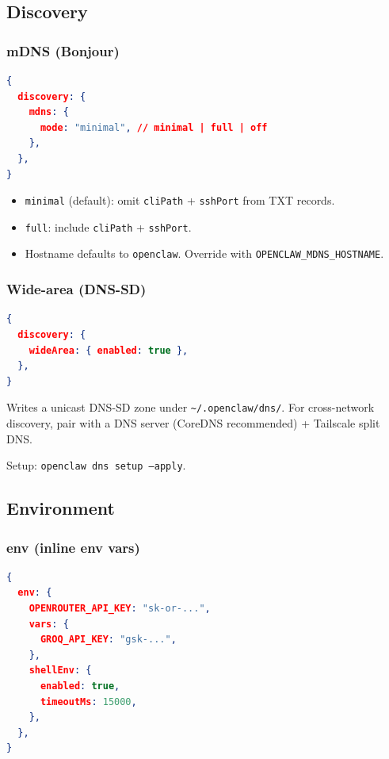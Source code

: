 \hrulefill


\subsection{Discovery}


\subsubsection{mDNS (Bonjour)}


\begin{lstlisting}[language=json]
{
  discovery: {
    mdns: {
      mode: "minimal", // minimal | full | off
    },
  },
}
\end{lstlisting}


\begin{itemize}
  \item \texttt{minimal} (default): omit \texttt{cliPath} + \texttt{sshPort} from TXT records.
  \item \texttt{full}: include \texttt{cliPath} + \texttt{sshPort}.
  \item Hostname defaults to \texttt{openclaw}. Override with \texttt{OPENCLAW\_MDNS\_HOSTNAME}.
\end{itemize}


\subsubsection{Wide-area (DNS-SD)}


\begin{lstlisting}[language=json]
{
  discovery: {
    wideArea: { enabled: true },
  },
}
\end{lstlisting}


Writes a unicast DNS-SD zone under \texttt{\textasciitilde{}/.openclaw/dns/}. For cross-network discovery, pair with a DNS server (CoreDNS recommended) + Tailscale split DNS.

Setup: \texttt{openclaw dns setup --apply}.

\hrulefill


\subsection{Environment}


\subsubsection{env (inline env vars)}


\begin{lstlisting}[language=json]
{
  env: {
    OPENROUTER_API_KEY: "sk-or-...",
    vars: {
      GROQ_API_KEY: "gsk-...",
    },
    shellEnv: {
      enabled: true,
      timeoutMs: 15000,
    },
  },
}
\end{lstlisting}


